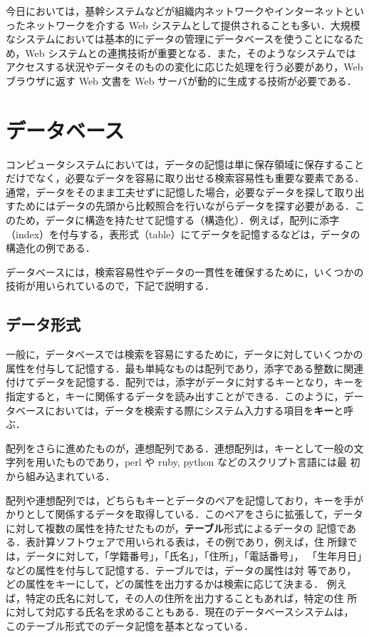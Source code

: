 今日においては，基幹システムなどが組織内ネットワークやインターネットといったネットワークを介する Web システムとして提供されることも多い．大規模なシステムにおいては基本的にデータの管理にデータベースを使うことになるため，Web システムとの連携技術が重要となる．また，そのようなシステムではアクセスする状況やデータそのものの変化に応じた処理を行う必要があり，Web ブラウザに返す Web 文書を Web サーバが動的に生成する技術が必要である．

\section{データベース}
コンピュータシステムにおいては，データの記憶は単に保存領域に保存すること
だけでなく，必要なデータを容易に取り出せる検索容易性も重要な要素である．
通常，データをそのまま工夫せずに記憶した場合，必要なデータを探して取り出
すためにはデータの先頭から比較照合を行いながらデータを探す必要がある．こ
のため，データに構造を持たせて記憶する（構造化）．例えば，配列に添字
（index）を付与する，表形式（table）にてデータを記憶するなどは，データの
構造化の例である．

データベースには，検索容易性やデータの一貫性を確保するために，いくつかの
技術が用いられているので，下記で説明する．

\subsection{データ形式}
一般に，データベースでは検索を容易にするために，データに対していくつかの
属性を付与して記憶する．最も単純なものは配列であり，添字である整数に関連
付けてデータを記憶する．配列では，添字がデータに対するキーとなり，キーを
指定すると，キーに関係するデータを読み出すことができる．このように，デー
タベースにおいては，データを検索する際にシステム入力する項目を\textbf{キー}と呼ぶ．

配列をさらに進めたものが，連想配列である．連想配列は，キーとして一般の文
字列を用いたものであり，perl や ruby, python などのスクリプト言語には最
初から組み込まれている．

配列や連想配列では，どちらもキーとデータのペアを記憶しており，キーを手が
かりとして関係するデータを取得している．このペアをさらに拡張して，データ
に対して複数の属性を持たせたものが，\textbf{テーブル}形式によるデータの
記憶である．表計算ソフトウェアで用いられる表は，その例であり，例えば，住
所録では，データに対して，「学籍番号」，「氏名」，「住所」，「電話番号」，
「生年月日」などの属性を付与して記憶する．テーブルでは，データの属性は対
等であり，どの属性をキーにして，どの属性を出力するかは検索に応じて決まる．
例えば，特定の氏名に対して，その人の住所を出力することもあれば，特定の住
所に対して対応する氏名を求めることもある．現在のデータベースシステムは，
このテーブル形式でのデータ記憶を基本となっている．

